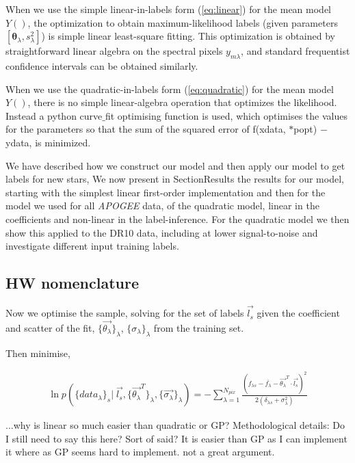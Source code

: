 \documentclass[12pt, preprint]{aastex}
\newcommand{\sectionname}{Section}
\newcommand{\set}[1]{\bm{#1}}
\newcommand{\mean}[1]{\overline{#1}}
\begin{document}
When we use the simple linear-in-labels form (\ref{eq:linear}) for the
mean model $Y()$, the optimization to obtain maximum-likelihood labels
(given parameters $[\set{\theta}_\lambda, s_\lambda^2]$) is simple linear
least-square fitting.
This optimization is obtained by straightforward linear algebra on the
spectral pixels $y_{m\lambda}$, and standard frequentist confidence
intervals can be obtained similarly.

When we use the quadratic-in-labels form (\ref{eq:quadratic}) for the
mean model $Y()$, there is no simple linear-algebra operation that
optimizes the likelihood. Instead a python curve$\_$fit optimising function is used, which optimises the values for the parameters so that the sum of the squared error of f(xdata, $*$popt) $-$ ydata,  is minimized. 

We have described how we construct our model and then apply our model to get labels for new stars, We now present in \sectionname{Results} the results for our model, starting with the simplest linear first-order implementation and then for the model we used for all \textit{APOGEE} data, of the quadratic model, linear in the coefficients and non-linear in the label-inference.  For the quadratic model we then show this applied to the DR10 data, including at lower signal-to-noise and investigate different input training labels. 

\subsection{HW nomenclature}

Now we optimise the sample, solving for the set of labels $\vec{l_s}$ given the coefficient and scatter of the fit, $ \{ \vec{\theta_\lambda} \}_\lambda $, 
$\{ \sigma_\lambda \}_\lambda$ from the training set. 

Then minimise, 

 \begin{eqnarray}
\ln p ( \{ data_\lambda \}_s | \; \vec{l_s}, \{ \vec{\theta_\lambda }^T \}_\lambda, \{ \vec{\sigma_\lambda }\}_\lambda )  = 
- \sum\limits_{\lambda=1}^{N_{pix}}  \frac{(f_{\lambda s } - \mean{f_\lambda} - \vec{\theta_\lambda }^T  \cdot \vec{l_s})^2} {2(\delta_{\lambda s} + \sigma_\lambda^{2})}
\end{eqnarray}


...why is linear so much easier than quadratic or GP?  Methodological details: Do I still need to say this here? Sort of said? It is easier than GP as I can implement it where as GP seems hard to implement. not a great argument. 
\end{document}
